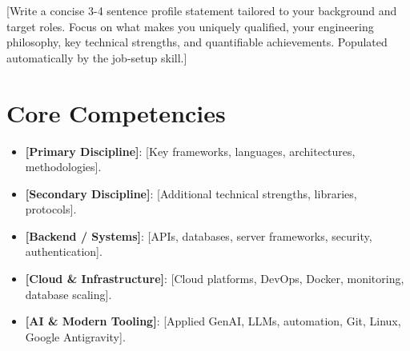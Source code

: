\documentclass[11pt,a4paper,sans]{moderncv}
\begin{document}
\makecvtitle


\vspace{4pt}
\small{[Write a concise 3-4 sentence profile statement tailored to your background and target roles. Focus on what makes you uniquely qualified, your engineering philosophy, key technical strengths, and quantifiable achievements. Populated automatically by the job-setup skill.]}


\section{Core Competencies}
\vspace{1pt}
\begin{itemize}
\item \textbf{[Primary Discipline]}: [Key frameworks, languages, architectures, methodologies].
\item \textbf{[Secondary Discipline]}: [Additional technical strengths, libraries, protocols].
\item \textbf{[Backend / Systems]}: [APIs, databases, server frameworks, security, authentication].
\item \textbf{[Cloud \& Infrastructure]}: [Cloud platforms, DevOps, Docker, monitoring, database scaling].
\item \textbf{[AI \& Modern Tooling]}: [Applied GenAI, LLMs, automation, Git, Linux, Google Antigravity].
\end{itemize}

\end{document}
